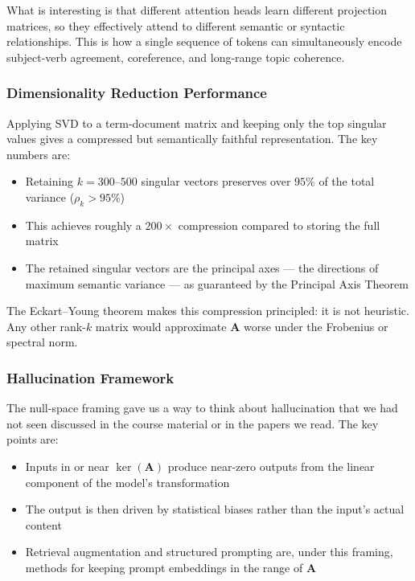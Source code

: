\documentclass[12pt,a4paper]{article}
\begin{document}
What is interesting is that different attention heads learn different projection matrices,
so they effectively attend to different semantic or syntactic relationships. This is how a
single sequence of tokens can simultaneously encode subject-verb agreement, coreference,
and long-range topic coherence.

\subsubsection{Dimensionality Reduction Performance}

Applying SVD to a term-document matrix and keeping only the top singular values gives a
compressed but semantically faithful representation. The key numbers are:

\begin{itemize}[itemsep=4pt]
    \item Retaining $k = 300$--$500$ singular vectors preserves over $95\%$ of the total
          variance ($\rho_k > 95\%$)
    \item This achieves roughly a $200\times$ compression compared to storing the full matrix
    \item The retained singular vectors are the principal axes --- the directions of maximum
          semantic variance --- as guaranteed by the Principal Axis Theorem
\end{itemize}

The Eckart--Young theorem makes this compression principled: it is not heuristic. Any other
rank-$k$ matrix would approximate $\mathbf{A}$ worse under the Frobenius or spectral norm.

\subsubsection{Hallucination Framework}

The null-space framing gave us a way to think about hallucination that we had not seen
discussed in the course material or in the papers we read. The key points are:

\begin{itemize}[itemsep=4pt]
    \item Inputs in or near $\ker(\mathbf{A})$ produce near-zero outputs from the linear
          component of the model's transformation
    \item The output is then driven by statistical biases rather than the input's actual
          content
    \item Retrieval augmentation and structured prompting are, under this framing, methods
          for keeping prompt embeddings in the range of $\mathbf{A}$
\end{itemize}
\end{document}
